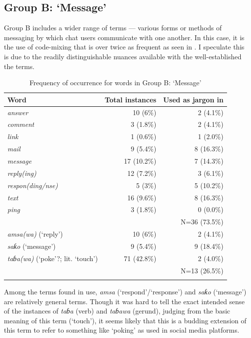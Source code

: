 \documentclass[output=paper,newtxmath,modfonts,nonflat,hidelinks]{langsci/langscibook}
\begin{document}
\subsection{Group B: ‘Message’}

Group B includes a wider range of terms — various forms or methods of messaging by which chat users communicate with one another. In this case, it is the use of  code-mixing that is over twice as frequent as seen in . I speculate this is due to the readily distinguishable nuances available with the well-established the  terms. 

\begin{table}
\begin{tabularx}{\textwidth}{Qrr}
\lsptoprule
Word & Total instances & Used as jargon in \\
\midrule
\textit{answer}           & 10 (6\%)  & 2 (4.1\%)\\
\textit{comment}          & 3 (1.8\%) & 2 (4.1\%)\\
\textit{link}             & 1 (0.6\%) & 1 (2.0\%)\\
\textit{mail}             & 9 (5.4\%) & 8 (16.3\%)\\
\textit{message}          & 17 (10.2\%) & 7 (14.3\%)\\
\textit{reply(ing)}       & 12 (7.2\%) & 3 (6.1\%)\\
\textit{respon(ding/nse)} & 5 (3\%) & 5 (10.2\%)\\
\textit{text}             & 16 (9.6\%) & 8 (16.3\%)\\
\textit{ping}             & 3 (1.8\%) & 0 (0.0\%)\\\midrule
& & N=36 (73.5\%)\\\midrule
\textit{amsa(wa)} (‘reply’)                & 10 (6\%) & 2 (4.1\%)\\
\textit{saƙo} (‘message’)                  & 9 (5.4\%) & 9 (18.4\%)\\
\textit{taɓa(wa)} (‘poke’?; lit. ‘touch’) & 71 (42.8\%) & 2 (4.0\%)\\\midrule
& & N=13 (26.5\%)\\
\lspbottomrule
\end{tabularx} 
\caption{Frequency of occurrence for words in Group B: ‘Message’}
\label{tab:purvis:4}
\end{table} 

Among the  terms found in use, \textit{amsa} (‘respond’/‘response’) and \textit{saƙo} (‘message’) are relatively general terms. Though it was hard to tell the exact intended sense of the instances of \textit{taɓa} (verb) and \textit{taɓawa} (gerund), judging from the basic meaning of this term (‘touch’), it seems likely that this is a budding extension of this term to refer to something like ‘poking’ as used in social media platforms. 
\end{document}
